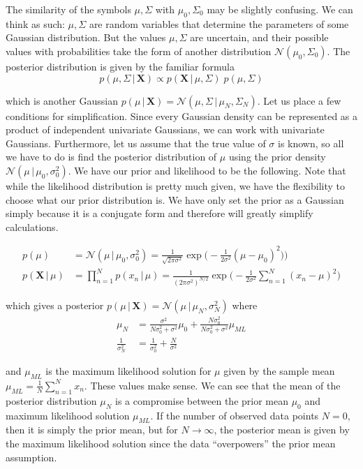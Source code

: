 \documentclass{article}
\begin{document}
    The similarity of the symbols $\mu, \Sigma$ with $\mu_0, \Sigma_0$ may be slightly confusing. We can think as such: $\mu, \Sigma$ are random variables that determine the parameters of some Gaussian distribution. But the values $\mu, \Sigma$ are uncertain, and their possible values with probabilities take the form of another distribution $\mathcal{N}(\mu_0, \Sigma_0)$. The posterior distribution is given by the familiar formula
    \begin{equation}
      p(\mu, \Sigma\,|\,\mathbf{X}) \propto p(\mathbf{X}\,|\,\mu, \Sigma) \; p(\mu, \Sigma)
    \end{equation}

    which is another Gaussian $p(\mu\,|\,\mathbf{X}) = \mathcal{N}(\mu, \Sigma\,|\, \mu_N, \Sigma_N)$. Let us place a few conditions for simplification. Since every Gaussian density can be represented as a product of independent univariate Gaussians, we can work with univariate Gaussians. Furthermore, let us assume that the true value of $\sigma$ is known, so all we have to do is find the posterior distribution of $\mu$ using the prior density $\mathcal{N}(\mu\,|\,\mu_0, \sigma_0^2)$. We have our prior and likelihood to be the following. Note that while the likelihood distribution is pretty much given, we have the flexibility to choose what our prior distribution is. We have only set the prior as a Gaussian simply because it is a conjugate form and therefore will greatly simplify calculations.

    \begin{align*}
      p(\mu) & = \mathcal{N}(\mu\,|\,\mu_0, \sigma_0^2) = \frac{1}{\sqrt{2 \pi \sigma^2}} \exp\bigg(-\frac{1}{2\sigma^2} (\mu - \mu_0)^2) \bigg) \\
      p(\mathbf{X}\,|\,\mu) & = \prod_{n=1}^N p(x_n\,|\,\mu) = \frac{1}{(2 \pi \sigma^2)^{N/2}} \exp\bigg(-\frac{1}{2 \sigma^2} \sum_{n=1}^N (x_n - \mu)^2 \bigg)
    \end{align*}

    which gives a posterior $p(\mu\,|\,\mathbf{X}) = \mathcal{N}(\mu \,|\, \mu_N, \sigma_N^2)$ where
    \begin{align*}
      \mu_N & = \frac{\sigma^2}{N \sigma_0^2 + \sigma^2} \mu_0 + \frac{N \sigma_0^2}{N \sigma_0^2 + \sigma^2} \mu_{ML} \\
      \frac{1}{\sigma_N^2} & = \frac{1}{\sigma_0^2} + \frac{N}{\sigma^2}
    \end{align*}

    and $\mu_{ML}$ is the maximum likelihood solution for $\mu$ given by the sample mean $\mu_{ML} = \frac{1}{N} \sum_{n=1}^N x_n$. These values make sense. We can see that the mean of the posterior distribution $\mu_N$ is a compromise between the prior mean $\mu_0$ and maximum likelihood solution $\mu_{ML}$. If the number of observed data points $N=0$, then it is simply the prior mean, but for $N \rightarrow \infty$, the posterior mean is given by the maximum likelihood solution since the data ``overpowers'' the prior mean assumption.
\end{document}
